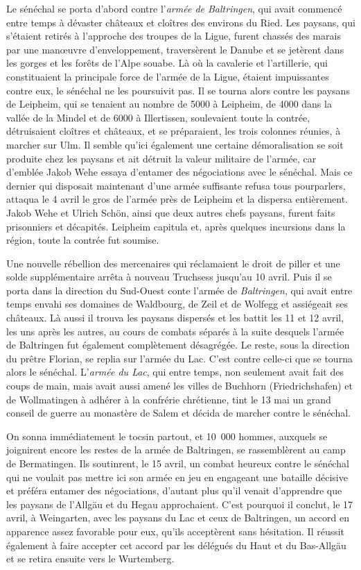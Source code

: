\documentclass[french,twoside]{book} %
\begin{document}
Le sénéchal se porta d’abord contre l’\emph{armée de Baltringen}, qui avait commencé entre temps à dévaster châteaux et cloîtres des environs du Ried. Les paysans, qui s’étaient retirés à l’approche des troupes de la Ligue, furent chassés des marais par une manœuvre d’enveloppement, traversèrent le Danube et se jetèrent dans les gorges et les forêts de l’Alpe souabe. Là où la cavalerie et l’artillerie, qui constituaient la principale force de l’armée de la Ligue, étaient impuissantes contre eux, le sénéchal ne les poursuivit pas. Il se tourna alors contre les paysans de Leipheim, qui se tenaient au nombre de 5000 à Leipheim, de 4000 dans la vallée de la Mindel et de 6000 à Illertissen, soulevaient toute la contrée, détruisaient cloîtres et châteaux, et se préparaient, les trois colonnes réunies, à marcher sur Ulm. Il semble qu’ici également une certaine démoralisation se soit produite chez les paysans et ait détruit la valeur militaire de l’armée, car d’emblée Jakob Wehe essaya d’entamer des négociations avec le sénéchal. Mais ce dernier qui disposait maintenant d’une armée suffisante refusa tous pourparlers, attaqua le 4 avril le gros de l’armée près de Leipheim et la dispersa entièrement. Jakob Wehe et Ulrich Schön, ainsi que deux autres chefs paysans, furent faits prisonniers et décapités. Leipheim capitula et, après quelques incursions dans la région, toute la contrée fut soumise.\par
Une nouvelle rébellion des mercenaires qui réclamaient le droit de piller et une solde supplémentaire arrêta à nouveau Truchsess jusqu’au 10 avril. Puis il se porta dans la direction du Sud-Ouest conte l’armée de \emph{Baltringen}, qui avait entre temps envahi ses domaines de Waldbourg, de Zeil et de Wolfegg et assiégeait ses châteaux. Là aussi il trouva les paysans dispersés et les battit les 11 et 12 avril, les uns après les autres, au cours de combats séparés à la suite desquels l’armée de Baltringen fut également complètement désagrégée. Le reste, sous la direction du prêtre Florian, se replia sur l’armée du Lac. C’est contre celle-ci que se tourna alors le sénéchal. L’\emph{armée du Lac}, qui entre temps, non seulement avait fait des coups de main, mais avait aussi amené les villes de Buchhorn (Friedrichshafen) et de Wollmatingen à adhérer à la confrérie chrétienne, tint le 13 mai un grand conseil de guerre au monastère de Salem et décida de marcher contre le sénéchal.\par
On sonna immédiatement le tocsin partout, et 10 000 hommes, auxquels se joignirent encore les restes de la armée de Baltringen, se rassemblèrent au camp de Bermatingen. Ils soutinrent, le 15 avril, un combat heureux contre le sénéchal qui ne voulait pas mettre ici son armée en jeu en engageant une bataille décisive et préféra entamer des négociations, d’autant plus qu’il venait d’apprendre que les paysans de l’Allgäu et du Hegau approchaient. C’est pourquoi il conclut, le 17 avril, à Weingarten, avec les paysans du Lac et ceux de Baltringen, un accord en apparence assez favorable pour eux, qu’ils acceptèrent sans hésitation. Il réussit également à faire accepter cet accord par les délégués du Haut et du Bas-Allgäu et se retira ensuite vers le Wurtemberg.\par
\end{document}
